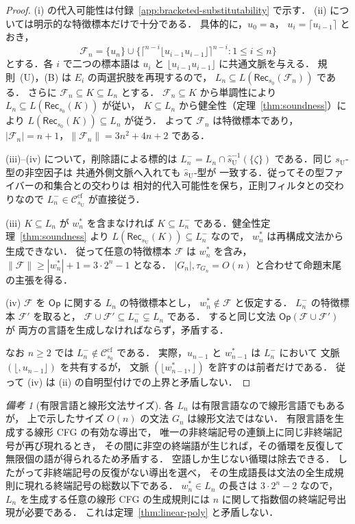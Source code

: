 \documentclass[11pt,a4paper]{ltjsarticle}
\theoremstyle{remark}
\newtheorem{remark}[theorem]{備考}
\theoremstyle{plain}
\newcommand{\cf}{\mathrm{cf}}
\newcommand{\Ccf}[1]{\mathcal C_{#1}^{\cf}}
\begin{document}
\begin{proof}
(i) の代入可能性は付録~\ref{app:bracketed-substitutability} で示す．
(ii) については明示的な特徴標本だけで十分である．
具体的に，$u_0=\mathtt a$，
$u_i=\lceil{}u_{i-1}\rceil$ とおき，
\[
\mathcal F_n=\{u_n\}\cup
\{\lceil^{n-i}\lfloor u_{i-1}u_{i-1}\rfloor
\rceil^{n-i}:1\le i\le n\}
\]
とする．各 $i$ で二つの標本語は
$u_i$ と $\lfloor u_{i-1}u_{i-1}\rfloor$ に共通文脈を与える．
規則~\textup{(U)}，\textup{(B)} は $E_i$ の両選択肢を再現するので，
$L_n\subseteq L(\mathsf{Rec}_{s_0}(\mathcal F_n))$ である．
さらに $\mathcal F_n\subseteq K\subseteq L_n$ とする．
$\mathcal F_n\subseteq K$ から単調性により
$L_n\subseteq L(\mathsf{Rec}_{s_0}(K))$ が従い，
$K\subseteq L_n$ から健全性（定理~\ref{thm:soundness}）により
$L(\mathsf{Rec}_{s_0}(K))\subseteq L_n$ が従う．
よって $\mathcal F_n$ は特徴標本であり，
$|\mathcal F_n|=n+1$，$\|\mathcal F_n\|=3n^2+4n+2$ である．

(iii)--(iv) について，削除語による標的は
$L_n^-=L_n\cap\widehat{s}_{\mathrm U}^{-1}(\{\zeta\})$
である．同じ $s_{\mathrm U}$-型の非空因子は
共通外側文脈へ入れても $\widehat{s}_{\mathrm U}$-型が
一致する．従ってその型ファイバーの和集合との交わりは
相対的代入可能性を保ち，正則フィルタとの交わりなので
$L_n^-\in\Ccf{s_{\mathrm U}}$ が直接従う．

(iii) $K\subseteq L_n$ が $w_n^*$ を含まなければ
$K\subseteq L_n^-$ である．健全性定理~\ref{thm:soundness} より
$L(\mathsf{Rec}_{s_{\mathrm U}}(K))\subseteq L_n^-$ なので，
$w_n^*$ は再構成文法から生成できない．
従って任意の特徴標本 $\mathcal F$ は $w_n^*$ を含み，
$\|\mathcal F\|\ge |w_n^*|+1=3\cdot2^n-1$ となる．
$|G_n|,\tau_{G_n}=O(n)$ と合わせて命題末尾の主張を得る．

(iv) $\mathcal F$ を $\mathsf{Op}$ に関する $L_n$ の特徴標本とし，
$w_n^*\notin\mathcal F$ と仮定する．
$L_n^-$ の特徴標本 $\mathcal F'$ を取ると，
$\mathcal F\cup\mathcal F'\subseteq L_n^-\subsetneq L_n$ である．
すると同じ文法 $\mathsf{Op}(\mathcal F\cup\mathcal F')$ が
両方の言語を生成しなければならず，矛盾する．

なお $n\ge2$ では $L_n^-\notin\Ccf{s_0}$ である．
実際，$u_{n-1}$ と $w_{n-1}^*$ は $L_n^-$ において
文脈 $(\lfloor,u_{n-1}\rfloor)$ を共有するが，
文脈 $(\lfloor w_{n-1}^*,\rfloor)$ を許すのは前者だけである．
従って (iv) は (ii) の自明型付けでの上界と矛盾しない．
\end{proof}

\begin{remark}[有限言語と線形文法サイズ]
各 $L_n$ は有限言語なので線形言語でもあるが，
上で示したサイズ $O(n)$ の文法 $G_n$ は線形文法ではない．
有限言語を生成する線形 CFG の有効な導出で，
唯一の非終端記号の連鎖上に同じ非終端記号が再び現れるとき，
その間に非空の終端語が生じれば，その循環を反復して
無限個の語が得られるため矛盾する．
空語しか生じない循環は除去できる．
したがって非終端記号の反復がない導出を選べ，
その生成語長は文法の全生成規則に現れる終端記号の総数以下である．
$w_n^*\in L_n$ の長さは $3\cdot2^n-2$ なので，
$L_n$ を生成する任意の線形 CFG の生成規則には
$n$ に関して指数個の終端記号出現が必要である．
これは定理~\ref{thm:linear-poly} と矛盾しない．
\end{remark}
\end{document}
